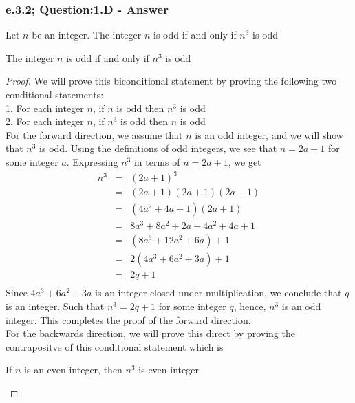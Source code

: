 \subsubsection*{e.3.2; Question:1.D - Answer}
Let $n$ be an integer. The integer $n$ is odd if and only if $n^3$ is odd

\begin{tcolorbox}
	\begin{theorem}
		The integer $n$ is odd if and only if $n^3$ is odd
	\end{theorem}
\end{tcolorbox}

\begin{proof}
We will prove this biconditional statement by proving the following two conditional statements: \\
1. For each integer $n$, if $n$ is odd then $n^3$ is odd \\
2. For each integer $n$, if $n^3$ is odd then $n$ is odd \\

For the forward direction, we assume that $n$ is an odd integer, and we will show that $n^3$ is odd. Using the definitions of odd integers, we see that $n = 2a + 1$ for some integer $a$. Expressing $n^3$ in terms of $n = 2a + 1$, we get
	\begin{eqnarray*}
		n^3 & = & (2a + 1)^3  \nonumber \\
		& = & (2a + 1)(2a + 1)(2a + 1) \nonumber \\
		& = & (4a^2 + 4a + 1)(2a + 1) \nonumber \\		
		& = & 8a^3 + 8a^2 + 2a + 4a^2 + 4a + 1 \nonumber \\			
		& = & (8a^3 + 12a^2 + 6a) + 1 \nonumber \\
		& = & 2(4a^3 + 6a^2 + 3a) + 1 \nonumber \\
		& = & 2q + 1 \nonumber \\
	\end{eqnarray*}
Since $4a^3 + 6a^2 + 3a$ is an integer closed under multiplication, we conclude that $q$ is an integer. Such that $n^3 = 2q + 1$ for some integer $q$, hence, $n^3$ is an odd integer. This completes the proof of the forward direction. \\
For the backwards direction, we will prove this direct by proving the contrapositve of this conditional statement which is
	\begin{center}
		If $n$ is an even integer, then $n^3$ is even integer
	\end{center}


\end{proof}
